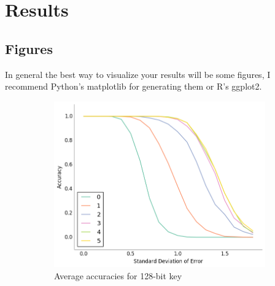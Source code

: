 \documentclass{project-logbook}
\begin{document}
{%

\section{Results} %
\label{sec:results}

\subsection{Figures} %
\label{sub:figures}

\begin{tip}
In general the best way to visualize your results will be some figures, I recommend Python's matplotlib for generating them or R's ggplot2.
\end{tip}

\begin{figure}[htp]
    \centering
    \begin{subfigure}{0.48\textwidth}
        \centering
        \includegraphics[width=\textwidth]{figures/accuracy_128.png}
        \caption{Average accuracies for 128-bit key}
    \end{subfigure}
    \hspace{.35cm}
    \begin{subfigure}{0.48\textwidth}
        \centering

\end{subfigure}
\end{figure}}
\end{document}
